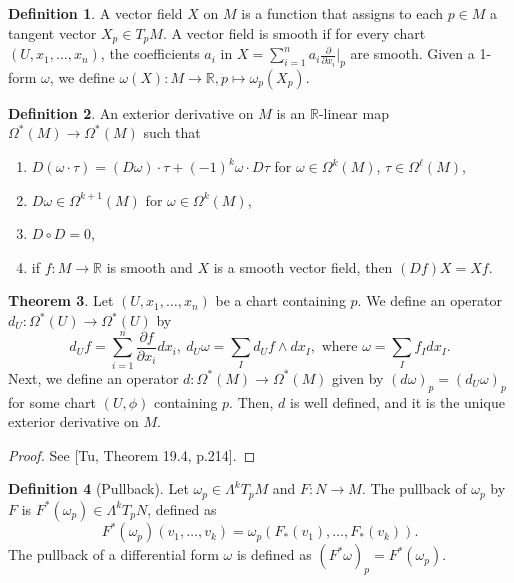 \documentclass[]{article}
\theoremstyle{definition}
\newtheorem{theorem}{Theorem}[section] %
\theoremstyle{definition}
\newtheorem{definition}[theorem]{Definition} %
\begin{document}
\begin{definition}
    A vector field $X$ on $M$ is a function that assigns to each $p\in M$ a tangent vector $X_p\in T_pM$. A vector field is smooth if for every chart $(U, x_1, \dots, x_n)$, the coefficients $a_i$ in $X=\sum_{i=1}^na_i\frac{\partial}{\partial x_i}|_p$ are smooth. Given a 1-form $\omega$, we define $\omega(X):M \rightarrow \mathbb{R}, p\mapsto \omega_p(X_p)$.
\end{definition}

\begin{definition}
    An exterior derivative on $M$ is an $\mathbb{R}$-linear map $\Omega^*(M) \rightarrow \Omega^*(M)$ such that \begin{enumerate}
        \item $D(\omega\cdot \tau)=(D\omega)\cdot \tau+(-1)^k\omega\cdot D\tau$ for $\omega\in \Omega^k(M)$, $\tau\in \Omega^\ell(M)$,
        \item $D\omega\in\Omega^{k+1}(M)$ for $\omega\in\Omega^k(M)$,
        \item $D\circ D=0$,
        \item if $f:M \rightarrow \mathbb{R}$ is smooth and $X$ is a smooth vector field, then $(Df)X=Xf$.
    \end{enumerate}
\end{definition}

\begin{theorem}
    Let $(U, x_1, \dots, x_n)$ be a chart containing $p$. We define an operator $d_U:\Omega^*(U) \rightarrow \Omega^*(U)$ by \[d_Uf=\sum_{i=1}^n \frac{\partial f}{\partial x_i}dx_i,\ d_U\omega=\sum_I d_Uf\wedge dx_I,\text{ where }\omega=\sum_I f_I dx_I.\] Next, we define an operator $d:\Omega^*(M)\rightarrow \Omega^*(M)$ given by $(d\omega)_p=(d_U\omega)_p$ for some chart $(U, \phi)$ containing $p$. Then, $d$ is well defined, and it is the unique exterior derivative on $M$.
\end{theorem}
\begin{proof}
    See [Tu, Theorem 19.4, p.214].
\end{proof}

\begin{definition}[Pullback]
    Let $\omega_p\in \Lambda^kT_pM$ and $F:N \rightarrow  M$. The pullback of $\omega_p$ by $F$ is $F^*(\omega_p)\in \Lambda^kT_pN$, defined as \[F^*(\omega_p)(v_1,\dots,v_k)=\omega_p(F_*(v_1),\dots, F_*(v_k)).\]
    The pullback of a differential form $\omega$ is defined as $(F^*\omega)_p=F^*(\omega_p)$.
\end{definition}
\end{document}
